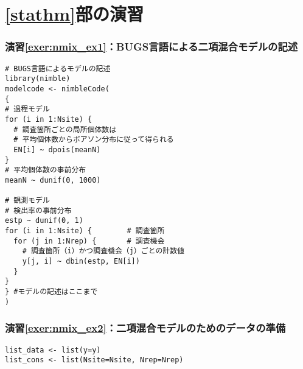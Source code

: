 \section*{\ref{stathm}部の演習}
    \subsubsection*{演習\ref{exer:nmix_ex1}：BUGS言語による二項混合モデルの記述}
\begin{verbatim}
# BUGS言語によるモデルの記述
library(nimble)
modelcode <- nimbleCode(
{
# 過程モデル
for (i in 1:Nsite) {
  # 調査箇所ごとの局所個体数は
  # 平均個体数からポアソン分布に従って得られる
  EN[i] ~ dpois(meanN)
}
# 平均個体数の事前分布
meanN ~ dunif(0, 1000)

# 観測モデル
# 検出率の事前分布
estp ~ dunif(0, 1)
for (i in 1:Nsite) {        # 調査箇所
  for (j in 1:Nrep) {       # 調査機会
    # 調査箇所（i）かつ調査機会（j）ごとの計数値
    y[j, i] ~ dbin(estp, EN[i])
  }
}
} #モデルの記述はここまで
)
\end{verbatim}

    \subsubsection*{演習\ref{exer:nmix_ex2}：二項混合モデルのためのデータの準備}
\begin{verbatim}
list_data <- list(y=y)
list_cons <- list(Nsite=Nsite, Nrep=Nrep)
\end{verbatim}

